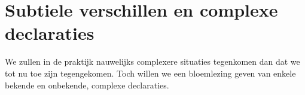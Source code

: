 

\section{Subtiele verschillen en complexe declaraties}
We zullen in de praktijk nauwelijks complexere situaties tegenkomen dan dat we tot nu toe zijn tegengekomen. Toch willen we een bloemlezing geven van enkele bekende en onbekende, complexe declaraties.

